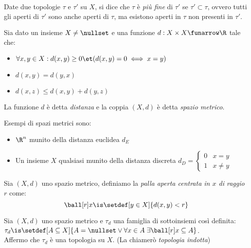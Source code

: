 \begin{defn}
Date due topologie $\tau$ e $\tau'$ su $X$, si dice che $\tau$ è \emph{più fine} di $\tau'$ se $\tau'\subset\tau$, ovvero tutti gli aperti di $\tau'$ sono anche aperti di $\tau$, ma esistono aperti in $\tau$ non presenti in $\tau'$.
\end{defn}


\begin{defn}
Sia dato un insieme $X\neq\nullset$ e una funzione $d: X \times X \funarrow \R$ tale che:
\begin{itemize}
\item $\forall x,y \in X:  d(x,y)\ge0 \et (d(x,y)=0 \iff x=y)$
\item $d(x,y) = d(y,x)$
\item $d(x,z) \le d(x,y) + d(y,z)$
\end{itemize}
La funzione $d$ è detta \emph{distanza} e la coppia $(X,d)$ è detta \emph{spazio metrico}.
\end{defn}

\begin{es}
Esempi di spazi metrici sono:
\begin{itemize}
\item  $\R^n$ munito della distanza euclidea $d_E$
\item Un insieme $X$ qualsiasi munito della distanza discreta $d_D= \begin{cases} 0 & x=y \\ 1 & x \neq y \end{cases}$
\end{itemize}
\end{es}

\begin{defn}
Sia $(X,d)$ uno spazio metrico, definiamo la \emph{palla aperta centrata in $x$ di raggio $r$} come:
\[\ball[r]x \is \setdef[y \in X]{d(x,y) < r}\]
\end{defn}

\begin{prop}
Sia $(X, d)$ uno spazio metrico e $\tau_d$ una famiglia di sottoinsiemi così definita: $\tau_d \is \setdef[A \subseteq  X]{A = \nullset \lor \forall x \in A \;\exists \ball[r]x \subseteq A}$. \\
Affermo che $\tau_d$ è una topologia su $X$. (La chiamerò \textit{topologia indotta})
\end{prop}

